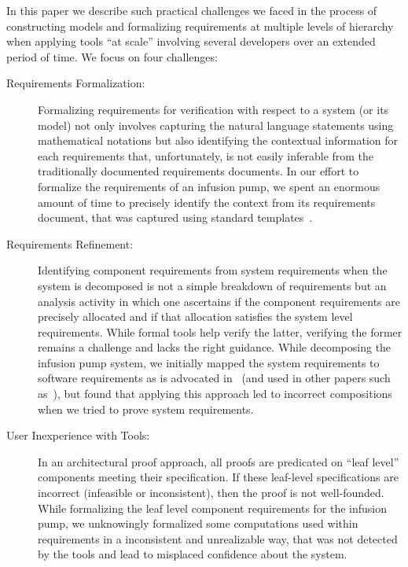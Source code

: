 In this paper we describe such practical challenges we faced in the process of constructing models and formalizing requirements at multiple levels of hierarchy when applying tools ``at scale'' involving several developers over an extended period of time.  We focus on four challenges:
\begin{description}
        \item[Requirements Formalization:] Formalizing requirements for verification with respect to a system (or its model) not only involves capturing the natural language statements using mathematical notations but also identifying the contextual information for each requirements that, unfortunately, is not easily inferable from the traditionally documented requirements documents. In our effort to formalize the requirements of an infusion pump, we spent an enormous amount of time to precisely identify the context from its requirements document, that was captured using standard templates~\cite{IEEESRS}. %
            
    \item[Requirements Refinement:] Identifying component requirements from system requirements when the system is decomposed is not a simple breakdown of requirements but an analysis activity in which one ascertains if the component requirements are precisely allocated and if that allocation satisfies the system level requirements. While formal tools help verify the latter, verifying the former remains a challenge and lacks the right guidance. While decomposing the infusion pump system, we initially mapped the system requirements to software requirements as is advocated in~\cite{Miller01:dasc} (and used in other papers such as~\cite{Jeffords:2010:MCV:1938390.1938407,Kauppinen07:re}), but found that applying this approach led to incorrect compositions when we tried to prove system requirements. %
    \item[User Inexperience with Tools:] In an architectural proof approach, all proofs are predicated on ``leaf level'' components meeting their specification.  If these leaf-level specifications are incorrect (infeasible or inconsistent), then the proof is not well-founded. While formalizing the leaf level component requirements for the infusion pump, we unknowingly formalized some computations used within requirements in a inconsistent and unrealizable way, that was not detected by the tools and lead to misplaced confidence about the system. %
        

\end{description}
